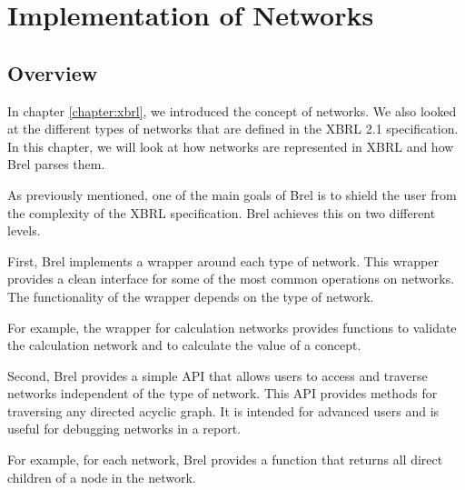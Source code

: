 \section{Implementation of Networks}

\subsection{Overview}

In chapter \ref{chapter:xbrl}, we introduced the concept of networks.
We also looked at the different types of networks that are defined in the XBRL 2.1 specification.
In this chapter, we will look at how networks are represented in XBRL and how Brel parses them.

As previously mentioned, one of the main goals of Brel is to shield the user from the complexity of the XBRL specification.
Brel achieves this on two different levels.

First, Brel implements a wrapper around each type of network.
This wrapper provides a clean interface for some of the most common operations on networks.
The functionality of the wrapper depends on the type of network.

For example, the wrapper for calculation networks provides functions to validate the calculation network and to calculate the value of a concept.

Second, Brel provides a simple API that allows users to access and traverse networks independent of the type of network.
This API provides methods for traversing any directed acyclic graph.
It is intended for advanced users and is useful for debugging networks in a report.

For example, for each network, Brel provides a function that returns all direct children of a node in the network.


